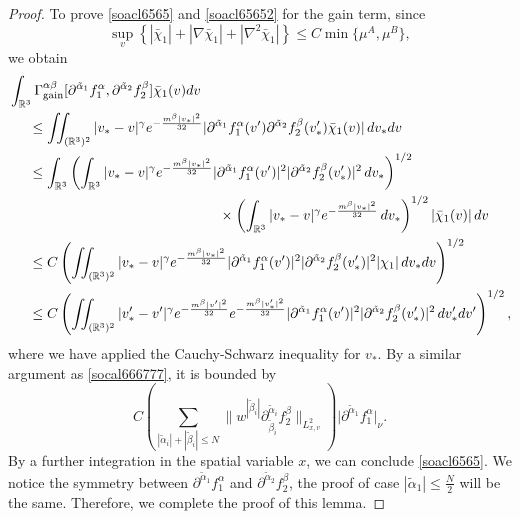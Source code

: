 \documentclass[reqno]{amsart}
\numberwithin{equation}{section}
\numberwithin{equation}{section}
\begin{document}
\begin{proof}
		To prove \eqref{soacl6565} and \eqref{soacl65652} for the gain term, since 
		$$
		\sup_{v}\left\{ \left| \bar{\chi}_1 \right|+\left| \nabla \bar{\chi}_1 \right|+\left| \nabla^2 \bar{\chi}_1 \right| \right\} \leq C \min \big\{\mu^A ,\mu^B \big\},
		$$
		we obtain
		\begin{align*}
		&\int_{\mathbb{R}^3} \Gamma_{\text{gain}}^{\alpha \beta} [\partial^{\tilde{\alpha}_1}f^{\alpha}_1, \partial^{\tilde{\alpha}_2}f^{\beta}_2] \bar{\chi}_1(v) dv\\
		&\hspace{0.5cm}\leq \iint_{(\mathbb{R}^3)^2} |v_* - v|^\gamma e^{-\frac{m^{\beta}|v_*|^2}{32}}|
		\partial^{\tilde{\alpha}_1}f^{\alpha}_1 (v') \partial^{\tilde{\alpha}_2}f^{\beta}_2 (v_*') \bar{\chi}_1(v)|\,dv_* dv  \\
		&\hspace{0.5cm}\le \int_{\mathbb{R}^3}\left(\int_{\mathbb{R}^3} |v_* - v|^\gamma e^{-\frac{m^{\beta}|v_*|^2}{32}}|\partial^{\tilde{\alpha}_1}f^{\alpha}_1 (v')|^2 |\partial^{\tilde{\alpha}_2}f^{\beta}_2 (v_*')|^2\,dv_*\right)^{1/2}\\
		&\hspace{5.3cm}\times\left(\int_{\mathbb{R}^3} |v_* - v|^\gamma e^{-\frac{m^{\beta}|v_*|^2}{32}}\,dv_*\right)^{1/2}|\bar{\chi}_1(v)|\,d v \\
		&\hspace{0.5cm}\le C\left(\iint_{(\mathbb{R}^3)^2} |v_* - v|^\gamma e^{-\frac{m^{\beta}|v_*|^2}{32}}|\partial^{\tilde{\alpha}_1}f^{\alpha}_1 (v')|^2 |\partial^{\tilde{\alpha}_2}f^{\beta}_2 (v_*')|^2|\chi_1|\,dv_* dv \right)^{1/2}\\
		&\hspace{0.5cm}\le C\left(\iint_{(\mathbb{R}^3)^2} |v_*' - v'|^\gamma e^{-\frac{m^{\beta}|v'|^2}{32}}e^{-\frac{m^{\beta}|v_*'|^2}{32}}|\partial^{\tilde{\alpha}_1}f^{\alpha}_1 (v')|^2 |\partial^{\tilde{\alpha}_2}f^{\beta}_2 (v_*')|^2\,dv_*' dv' \right)^{1/2},
		\end{align*}
		where we have applied the Cauchy-Schwarz inequality for \( v_* \). By a similar argument as  \eqref{socal666777}, it is bounded by
		\[
		C \left( \sum_{| \tilde{\alpha}_i |+| \tilde{\beta}_i | \le N} \big\| w^{| \tilde{\beta}_i |} \partial_{\tilde{\beta}_i}^{\tilde{\alpha}_i}f^{\beta}_2 \big\|_{L^{2}_{x,v}} \right) \big| \partial^{\tilde{\alpha}_1}f^{\alpha}_1 \big|_{\nu}.
		\]
		By a further integration in the spatial variable \( x \), we can conclude \eqref{soacl6565}. We notice the symmetry between $\partial^{\tilde{\alpha}_1}f^{\alpha}_1$ and $\partial^{\tilde{\alpha}_2}f^{\beta}_2$, the proof of case $\left|\tilde{\alpha}_1 \right| \leq \frac{N}{2}$ will be the same. Therefore, we complete the proof of this lemma.
	\end{proof}
	
\end{document}
